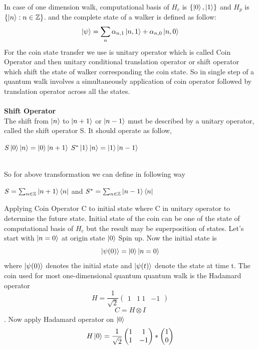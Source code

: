 \documentclass[11 pt]{article}
\theoremstyle{definition}
\theoremstyle{remark}
\newcommand{\tens}[1]{
  \mathbin{\mathop{\otimes}\limits_{#1}}}
\begin{document}
In case of one dimension walk, computational basis of $H_{c}$ is $ \{\ket{0},\ket{1}\}$ and $H_{p}$ is $ \{\ket{n} : n\in \mathbb{Z} \}$. and the complete state of a walker is defined as follow:
$$\ket{\psi} = \sum_{n} \alpha_{n,1}\ket{n,1} + \alpha_{n,0}\ket{n,0}$$
For the coin state transfer we use is unitary operator which is called Coin Operator and then unitary conditional translation operator or shift operator which shift the state of walker corresponding the coin state. So in single step of a quantum walk involves a simultaneously application of coin operator followed by translation operator across all the states.
\\
\\
\textbf{Shift Operator}\\
The shift from $\ket{n}$ to $\ket{n+1}$ or $\ket{n-1}$ must be described by a unitary operator, called the shift operator S. It should operate as follow,
\begin{center}
    $ S \ket{0}\ket{n} = \ket{0} \ket{n+1}$
    $ S^* \ket{1}\ket{n} = \ket{1} \ket{n-1}$
\end{center}\\
So for above transformation we can define in following way
\begin{center}
    $S = \sum_{n \in \mathbb{Z}} \ket{n+1}\bra{n}$ and 
    $S^* = \sum_{n \in \mathbb{Z}} \ket{n-1}\bra{n}$
\end{center}
Applying Coin Operator C to initial state where C in unitary operator to determine the future state. Initial state of the coin can be one of the state of computational basis of $H_c$ but the result may be superposition of states. Let's start with $\ket{n=0}$ at origin state $\ket{0}$ Spin up. Now the initial state is $$\ket{\psi(0)} = \ket{0}\ket{n=0}$$ where $\ket{\psi(0)}$ denotes the initial state and $\ket{\psi(t)}$ denote the state at time t.
The coin used for most one-dimensional quantum quantum walk is the Hadamard operator $$ H = \dfrac{1}{\sqrt{2}}
\begin{pmatrix}
           1 & 1\
           1 & -1
\end{pmatrix}$$
$$ C  = H \tens{} I $$.
Now apply Hadamard operator on $\ket{0}$
$$H\ket{0}  = \dfrac{1}{\sqrt{2}}\begin{pmatrix}
           1 & 1\\
           1 & -1
\end{pmatrix} * \begin{pmatrix}
           1\\0
\end{pmatrix}$$
\end{document}
